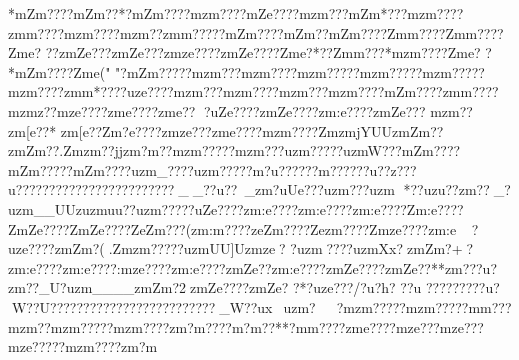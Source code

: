 {{{{{{{{{{{{{{{{{{{{{{{{{{{{{{{{{{{{{{{{{{{{{{{{{{{{{{{{{{{{{{{{{{{{{{{{{{{{{{{{{{{{{{{{{{{{{{{{{{{{{{{{{{{{{{{{{{{{{{{{{{{{{{{{{{{{{{{{{{{{{{{{{{{{{{{{{{{{{{{{{{{{{{{{{{{{{{{{{{{{{{{{{{{{{{{{{{{{{{{{{{{{{{{{{{{{{{{{{{{{{{{{{{{{{{{{{{{{{{{{{{{{{{{{{{{{{{{{{{{{{{{{{{{{{{{{{{{{{{{{{{{{{{{{{{{{{{{{{{{{{{{{{{{{{{{{{{{{{{{{{{{{{{{{{{{{{{{{{{{{{{{{{{{{{{{{{{{{{{{{{{{{{{{{{{{{{{{{{{{{{{{{{{{{{{{{{{{{{{{{{{{{{{{{{{{{{{{{{{{{{{{{{{{{{{{{{{{{{{{{{{{{{{{{{{{{{{{{{{{{{{{{{{{{{{{{{{{{{{{{{{{{{{{{{{{{{{{{{{{{{{{{{{{{{{{{{{{{{{{{{{{{{{{{{{{{{{{{{{{{{{{{{{{{{{{{{{{{{{{{{{{{{{{{{{{{{{{{{{{{{{{{{{{{{{{{{{{{{{{{{{{{{{{{{{{{{{{{{{{{{{{{{{{{{{{{{{{{{{{{{{{{{{{{{{{{{{{{{{{{{{{{{{{{{{{{{{{{{{{{{{{{{{{{{{{{{{{{{{{{{{{{{{{{{{{{{{{{{{{{{{{{{{{{{{{{{{{{{{{{{{{{{{{{{{{{{{{{{{{{{{{{{{{{{{{{{{{{{{{{{{{{{{{{{{{{{{{{{{{{{{{{{{{{{{{{{{{{{{{{{{{{{{{{{{{{{{{{{{{{{{{{{{{{{{{{{{{{{{{{{{{{{{{{{{{{{{{{{{{{{{{{{{{{{{{{{{{{{{{{{{{{{{{{{{{{{{{{{{{{{{{{{{{{{{{{{{{{{{{{{{{{{{{{{{{{{{{{{{{{{{{{{{{{{{{{{{{{{{{{*{mZm????{mZm??*?{mZm????{mzm????{mZe????{mzm???{mZm*???{mzm????zm{m????{mzm????{mzm??zm{m?????mZm????{mZm??{mZm????Zm{m????Zm{m????Zm{e?
??zmZe???zmZe???zmze????zmZe????Zm{e?*??Zm{m???*{mzm????Zm{e?
?*{mZm????Zm{e("
"?mZm?????mzm???mzm????{mzm?????mzm?????mzm?????mzm????zm{m*????uze????{mzm???{mzm????{mzm???{mzm????{mZm????zm{m????{mzm{z??{mze????zm{e????zm{e??
?uZe????zmZe????zm:e????zmZe???
{mzm?}}?zm[e??*
zm[e??Zm?e????zmze???zm{e????{mzm????ZmzmjYUUzmZm?? zmZm??. Zmzm??jjzm?m??  {mzm?????mzm???uzm?????uzmW???mZm????mZm?????mZm????{uzm_????uzm?????m?u?????}?m?????}?u??z??}?u??????}????????????}??????}__?}?u??~_zm?uUe???uzm ???uzm
*??uzu ??}zm??_?uzm__UUzuzmuu??uzm?????uZe????zm:e????zm:e????zm:e????Zm:e????ZmZe????ZmZe????ZeZm???(zm:m????zeZm????Zezm????Zmze????zm:e?uze????zmZm?(.Zmzm?????uzmUU]Uzmze ?
?uzm????uzmXx?zmZm?+?zm:e????zm:e????:mze????zm:e????zmZe??zm:e????zmZe????zmZe??**{}zm???u?}zm??_U?uzm____zmZm?2 zmZe????zmZe?
?*?uze???/?u?}h?  ?}?u 
		?}?}???????}u?W??}U??????}??????}??????}??????}?_W?}?ux~^^?uzm?~~~?mzm?????mzm?????m{m???mzm??mzm?????mzm????zm?m????{m?m??**?m{m????zm{e????{mze???mze???{mze?????mzm????zm?m
}}}}}}}}}}}}}}}}}}}}}}}}}}}}}}}}}}}}}}}}}}}}}}}}}}}}}}}}}}}}}}}}}}}}}}}}}}}}}}}}}}}}}}}}}}}}}}}}}}}}}}}}}}}}}}}}}}}}}}}}}}}}}}}}}}}}}}}}}}}}}}}}}}}}}}}}}}}}}}}}}}}}}}}}}}}}}}}}}}}}}}}}}}}}}}}}}}}}}}}}}}}}}}}}}}}}}}}}}}}}}}}}}}}}}}}}}}}}}}}}}}}}}}}}}}}}}}}}}}}}}}}}}}}}}}}}}}}}}}}}}}}}}}}}}}}}}}}}}}}}}}}}}}}}}}}}}}}}}}}}}}}}}}}}}}}}}}}}}}}}}}}}}}}}}}}}}}}}}}}}}}}}}}}}}}}}}}}}}}}}}}}}}}}}}}}}}}}}}}}}}}}}}}}}}}}}}}}}}}}}}}}}}}}}}}}}}}}}}}}}}}}}}}}}}}}}}}}}}}}}}}}}}}}}}}}}}}}}}}}}}}}}}}}}}}}}}}}}}}}}}}}}}}}}}}}}}}}}}}}}}}}}}}}}}}}}}}}}}}}}}}}}}}}}}}}}}}}}}}}}}}}}}}}}}}}}}}}}}}}}}}}}}}}}}}}}}}}}}}}}}}}}}}}}}}}}}}}}}}}}}}}}}}}}}}}}}}}}}}}}}}}}}}}}}}}}}}}}}}}}}}}}}}}}}}}}}}}}}}}}}}}}}}}}}}}}}}}}}}}}}}}}}}}}}}}}}}}}}}}}}}}}}}}}}}}}}}}}}}}}}}}}}}}}}}}}}}}}}}}}}}}}}}}}}}}}}}}}}}}}}}}}}}}}}}}}}}}}}}}}}}}}}}}}}}}}}}}}}}}}}}}}}}}}}}}}}}}}}}}}}}}}}}}}}}}}}}}}}}}}}}}}}}}}}}}}}}}}}}}}}}}}}}}}}}}}}}}}}}}}}}}}}}}}}}}}}}}}}}}}}}}}}}}}}}}}}}}}}}}}}}}}}}}}}}}}}}}}}}}}}}}}}}}}}}}}}}}}}}}}}}}}}}}}}}}}}}}}}}}}}}}}}
